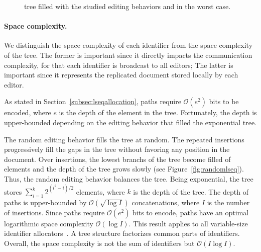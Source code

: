 \begin{figure}
  \centering
  \hspace{5pt}
  \hspace{5pt}
  \caption{\label{fig:complexity} \LSEQ tree filled with the studied editing
    behaviors and in the worst case.}
\end{figure}



\paragraph{Space complexity.}

We distinguish the space complexity of each identifier from the space complexity
of the tree. The former is important since it directly impacts the communication
complexity, for that each identifier is broadcast to all editors; The latter is
important since it represents the replicated document stored locally by each
editor.

As stated in Section~\ref{subsec:lseqallocation}, paths
require $\mathcal{O}(e^2)$ bits to be encoded,
where $e$ is the depth of the element in the tree. Fortunately, the depth is
upper-bounded depending on the editing behavior that filled the exponential
tree.

The random editing behavior fills the tree at random. The repeated insertions
progressively fill the gaps in the tree without favoring any position in the
document. Over insertions, the lowest branchs of the tree become filled of
elements and the depth of the tree grows slowly (see
Figure~\ref{fig:randomlseq}). Thus, the random editing behavior balances the
tree. Being exponential, the tree stores
$\textstyle\sum\nolimits_{i=1}^{k}{2^{(i^2-i)/2}}$ elements, where $k$ is the
depth of the tree. The depth of paths is upper-bounded by
$\mathcal{O}(\sqrt{\log I})$ concatenations, where $I$ is the number of
insertions. Since paths require $\mathcal{O}(e^2)$ bits to encode, paths have an
optimal logarithmic space complexity $\mathcal{O}(\log I)$. This result applies
to all variable-size identifier allocators~\cite{preguica2009commutative,
  weiss2009logoot}. A tree structure factorizes common parts of
identifiers. Overall, the space complexity is not the sum of identifiers but
$\mathcal{O}(I\log I)$.

